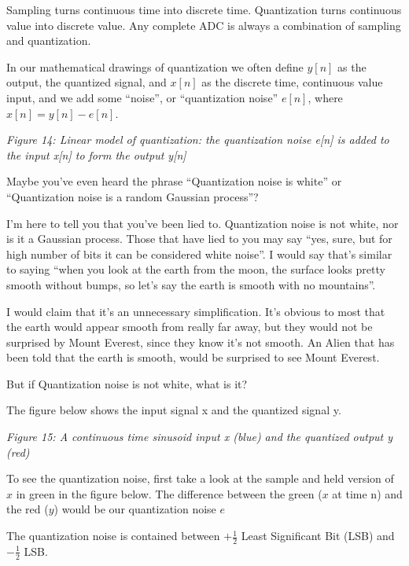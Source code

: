 Sampling turns continuous time into discrete time. Quantization turns
continuous value into discrete value. Any complete ADC is always a
combination of sampling and quantization.

In our mathematical drawings of quantization we often define \(y[n]\) as
the output, the quantized signal, and \(x[n]\) as the discrete time,
continuous value input, and we add some ``noise'', or ``quantization
noise'' \(e[n]\), where \(x[n] = y[n] - e[n]\).


{
\centering
{}
}

\emph{Figure 14: Linear model of quantization: the quantization noise
e{[}n{]} is added to the input x{[}n{]} to form the output y{[}n{]}}

Maybe you've even heard the phrase ``Quantization noise is white'' or
``Quantization noise is a random Gaussian process''?

I'm here to tell you that you've been lied to. Quantization noise is not
white, nor is it a Gaussian process. Those that have lied to you may say
``yes, sure, but for high number of bits it can be considered white
noise''. I would say that's similar to saying ``when you look at the
earth from the moon, the surface looks pretty smooth without bumps, so
let's say the earth is smooth with no mountains''.

I would claim that it's an unnecessary simplification. It's obvious to
most that the earth would appear smooth from really far away, but they
would not be surprised by Mount Everest, since they know it's not
smooth. An Alien that has been told that the earth is smooth, would be
surprised to see Mount Everest.

But if Quantization noise is not white, what is it?

The figure below shows the input signal x and the quantized signal y.


{
\centering
{}
}

\emph{Figure 15: A continuous time sinusoid input x (blue) and the
quantized output y (red)}

To see the quantization noise, first take a look at the sample and held
version of \(x\) in green in the figure below. The difference between
the green (\(x\) at time n) and the red (\(y\)) would be our
quantization noise \(e\)

The quantization noise is contained between \(+\frac{1}{2}\) Least
Significant Bit (LSB) and \(-\frac{1}{2}\) LSB.

